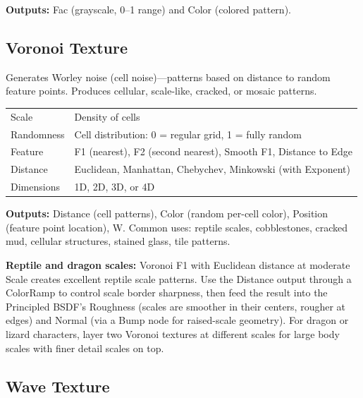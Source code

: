 \textbf{Outputs:} Fac (grayscale, 0--1 range) and Color (colored pattern).

\subsection{Voronoi Texture}

Generates Worley noise (cell noise)---patterns based on distance to
random feature points. Produces cellular, scale-like, cracked, or
mosaic patterns.

\begin{center}
\begin{tabularx}{\textwidth}{L{3cm}X}
\toprule
{}
 &  \\
\midrule
Scale & Density of cells \\
Randomness & Cell distribution: 0 = regular grid, 1 = fully random \\
Feature & F1 (nearest), F2 (second nearest), Smooth F1, Distance to Edge \\
Distance & Euclidean, Manhattan, Chebychev, Minkowski (with Exponent) \\
Dimensions & 1D, 2D, 3D, or 4D \\
\bottomrule
\end{tabularx}
\end{center}

\textbf{Outputs:} Distance (cell patterns), Color (random per-cell
color), Position (feature point location), W. Common uses: reptile
scales, cobblestones, cracked mud, cellular structures, stained
glass, tile patterns.

\begin{furrybox}
\textbf{Reptile and dragon scales:} Voronoi F1 with Euclidean
distance at moderate Scale creates excellent reptile scale patterns.
Use the Distance output through a ColorRamp to control scale border
sharpness, then feed the result into the Principled BSDF's
Roughness (scales are smoother in their centers, rougher at edges)
and Normal (via a Bump node for raised-scale geometry). For dragon
or lizard characters, layer two Voronoi textures at different
scales for large body scales with finer detail scales on top.
\end{furrybox}

\subsection{Wave Texture}

